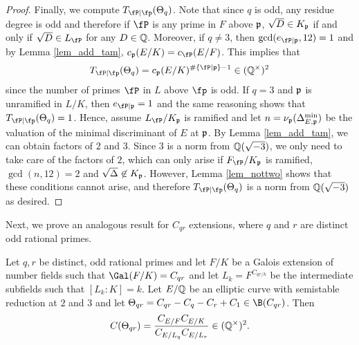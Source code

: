 \begin{proof}
    Finally, we compute $\Tp(\Theta_q)$. Note that since $q$ is odd, any residue degree is odd and therefore if $\fP$ is any prime in $F$ above $\mathfrak{p}$, $\sqrt{D}\in K_{\mathfrak{p}}$ if and only if $\sqrt{D}\in L_\fP$ for any $D\in\mathbb{Q}$. Moreover, if $q\neq 3$, then $\gcd(e_{\fP\mid\pp},12)=1$ and by Lemma \ref{lem_add_tam}, $c_\pp(E/K)=c_\fP(E/F)$. This implies that $$\Tp(\Theta_q)=c_\pp(E/K)^{\#\{\fP\mid\pp\}-1}\in\QQss$$ since the number of primes $\fP$ in $L$ above $\fp$ is odd. If $q=3$ and $\mathfrak{p}$ is unramified in $L/K$, then $e_{\fP\mid\pp}=1$ and the same reasoning shows that $\Tp(\Theta_q)=1$. Hence, assume $L_\fP/K_\pp$ is ramified and let $n=\nu_{\mathfrak{p}}(\Delta_{E,\mathfrak{p}}^{\min})$ be the valuation of the minimal discriminant of $E$ at $\mathfrak{p}$. By Lemma \ref{lem_add_tam}, we can obtain factors of $2$ and $3$. Since $3$ is a norm from $\mathbb{Q}(\sqrt{-3})$, we only need to take care of the factors of $2$, which can only arise if $F_\fP/K_\pp$ is ramified, $\gcd(n,12)=2$ and $\sqrt{\Delta}\not\in K_{\mathfrak{p}}$. However, Lemma \ref{lem_nottwo} shows that these conditions cannot arise, and therefore $\Tp(\Theta_q)$ is a norm from $\mathbb{Q}(\sqrt{-3})$ as desired.
\end{proof}

Next, we prove an analogous result for $C_{qr}$ extensions, where $q$ and $r$ are distinct odd rational primes.

\begin{lemma}\label{lem_Cpq}
    Let $q,r$ be distinct, odd rational primes and let $F/K$ be a Galois extension of number fields such that $\Gal(F/K)=C_{qr}$ and let $L_k=F^{C_{qr/k}}$ be the intermediate subfields such that $[L_k:K]=k$. Let $E/\mathbb{Q}$ be an elliptic curve with semistable reduction at $2$ and $3$ and let $\Theta_{qr}=C_{qr}-C_q-C_r+C_1\in \B(C_{qr})$. Then
    $$C(\Theta_{qr})=\frac{C_{E/F}C_{E/K}}{C_{E/L_q}C_{E/L_r}}\in(\mathbb{Q}^{\times})^2.$$
    
\end{lemma}

